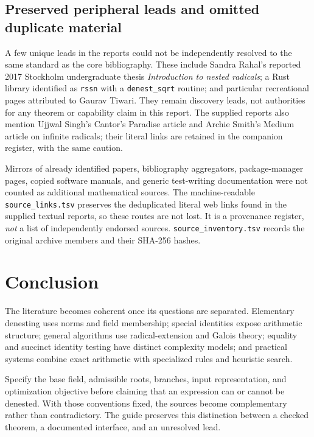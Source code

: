 \documentclass[11pt,letterpaper]{article}
\numberwithin{equation}{section}
\theoremstyle{definition}
\theoremstyle{remark}
\begin{document}
\subsection{Preserved peripheral leads and omitted duplicate material}\label{sec:peripheral}
A few unique leads in the reports could not be independently resolved to the same standard as the core bibliography. These include Sandra Rahal's reported 2017 Stockholm undergraduate thesis \emph{Introduction to nested radicals}; a Rust library identified as \texttt{rssn} with a \texttt{denest\_sqrt} routine; and particular recreational pages attributed to Gaurav Tiwari. They remain discovery leads, not authorities for any theorem or capability claim in this report. The supplied reports also mention Ujjwal Singh's Cantor's Paradise article and Archie Smith's Medium article on infinite radicals; their literal links are retained in the companion register, with the same caution.

Mirrors of already identified papers, bibliography aggregators, package-manager pages, copied software manuals, and generic test-writing documentation were not counted as additional mathematical sources. The machine-readable \texttt{source\_links.tsv} preserves the deduplicated literal web links found in the supplied textual reports, so these routes are not lost. It is a provenance register, \emph{not} a list of independently endorsed sources. \texttt{source\_inventory.tsv} records the original archive members and their SHA-256 hashes.

\section{Conclusion}
The literature becomes coherent once its questions are separated. Elementary denesting uses norms and field membership; special identities expose arithmetic structure; general algorithms use radical-extension and Galois theory; equality and succinct identity testing have distinct complexity models; and practical systems combine exact arithmetic with specialized rules and heuristic search.

Specify the base field, admissible roots, branches, input representation, and optimization objective before claiming that an expression can or cannot be denested. With those conventions fixed, the sources become complementary rather than contradictory. The guide preserves this distinction between a checked theorem, a documented interface, and an unresolved lead.

\clearpage
\end{document}
